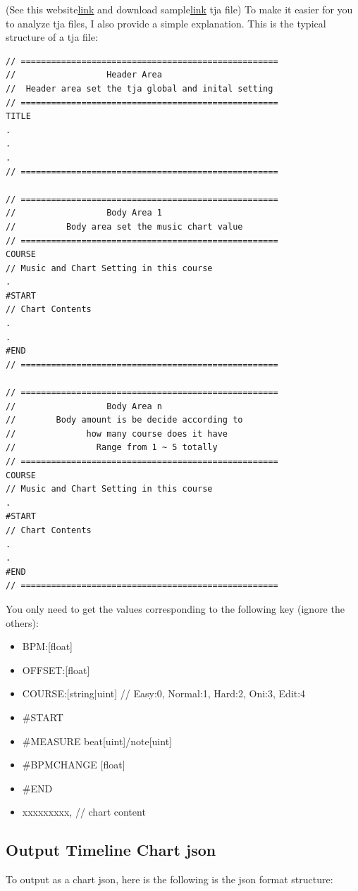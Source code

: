 \documentclass[a4paper,11pt, ctexart]{article}
\begin{document}
(See this website{\href{https://home.gamer.com.tw/artwork.php?sn=5189897}{\tiny link}} and download sample{\href{https://drive.google.com/drive/folders/1vyX1WX_bAHkd51JxgZWU8D_5Nfe-DGVw?usp=share_link}{\tiny link}} tja file) To make it easier for you to analyze tja files, I also provide a simple explanation. This is the typical structure of a tja file:

\begin{lstlisting}
// ===================================================
//                  Header Area
//  Header area set the tja global and inital setting
// ===================================================
TITLE
.
.
.
// ===================================================

// ===================================================
//                  Body Area 1
//          Body area set the music chart value
// ===================================================
COURSE
// Music and Chart Setting in this course
.
#START
// Chart Contents
.
.
#END
// ===================================================

// ===================================================
//                  Body Area n
//        Body amount is be decide according to
//              how many course does it have 
//                Range from 1 ~ 5 totally
// ===================================================
COURSE
// Music and Chart Setting in this course
.
#START
// Chart Contents
.
.
#END
// ===================================================
\end{lstlisting}

You only need to get the values corresponding to the following key (ignore the others):

\begin{itemize}
\item 
{
    BPM:[float]
}
\item 
{
    OFFSET:[float]
}
\item 
{
    COURSE:[string|uint]  // Easy:0, Normal:1, Hard:2, Oni:3, Edit:4
}
\item 
{
    \#START
}
\item 
{
    \#MEASURE beat[uint]/note[uint]
}
\item 
{
    \#BPMCHANGE [float]
}
\item 
{
    \#END
}
\item 
{
    xxxxxxxxx, // chart content
}
\end{itemize}

\subsection{Output Timeline Chart json}
To output as a chart json, here is the following is the json format structure:
\end{document}
